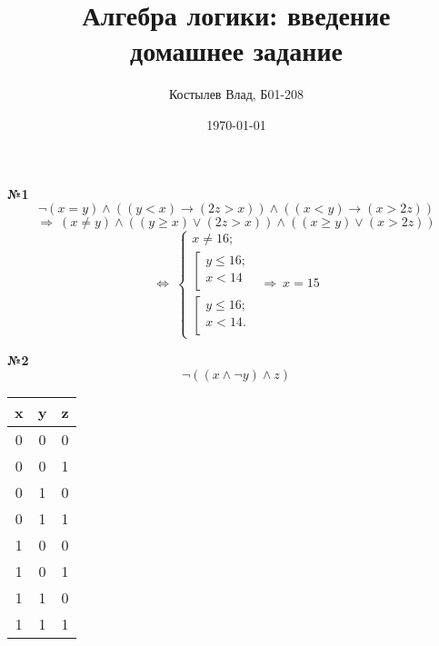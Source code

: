 \documentclass[a4paper, 12pt]{article}
\author{Костылев Влад, Б01-208}
\date{\today}
\title{\textbf{Алгебра логики: введение} \\ 
	домашнее задание}
\begin{document}
	\maketitle
	
	\textbf{№1}\
	\
	\[
		\neg(x = y) \wedge ((y < x) \rightarrow (2z > x)) \wedge ((x < y) \rightarrow (x > 2z)) 
	\]
	\[
		\Rightarrow \
		(x \not= y) \wedge ((y \geq x) \vee (2z > x)) \wedge ((x \geq y) \vee (x > 2z))
	\]
	\[
		\Leftrightarrow \
		\left\{ 
		\begin{gathered} 
			x \not= 16; \\
			\left[
			\begin{gathered}
				y \leq 16; \\ 
				x < 14     \\
			\end{gathered} 
			\right.
			\\
			\left[
			\begin{gathered}
				y \leq 16; \\ 
				x < 14.    \\
			\end{gathered} 
			\right.
		\end{gathered} 
		\right. \
		\Longrightarrow \
		x = 15
	\]
	
	\textbf{№2}\
	\
	\[
		\neg((x \wedge \neg y) \wedge z)
	\]
	
	\begin{table}[H]
	\centering	
	\begin{tabular}{|c|c|c|}
		\hline
		x & y & z \\ \hline
		0 & 0 & 0 \\ \hline
		0 & 0 & 1 \\ \hline
		0 & 1 & 0 \\ \hline
		0 & 1 & 1 \\ \hline	
		1 & 0 & 0 \\ \hline
		1 & 0 & 1 \\ \hline
		1 & 1 & 0 \\ \hline
	    1 & 1 & 1 \\ \hline
	\end{tabular}
	\end{table}
			
\end{document}
